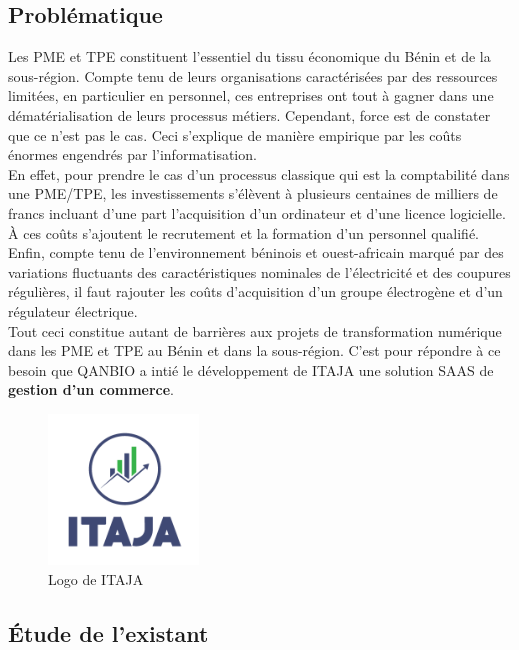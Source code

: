 \documentclass[12pt]{report}
\begin{document}
      \subsection{Problématique}
	Les \gls{PME} et \gls{TPE} constituent l’essentiel du tissu économique du Bénin et de la sous-région. Compte tenu de leurs organisations caractérisées par des ressources limitées, en particulier en personnel, ces entreprises ont tout à gagner dans une dématérialisation de leurs processus métiers. Cependant, force est de constater que ce n’est pas le cas. Ceci s’explique de manière empirique par les coûts énormes engendrés par l’informatisation.
	\\En effet, pour prendre le cas d’un processus classique qui est la comptabilité dans une PME/TPE, les investissements s’élèvent à plusieurs centaines de milliers de francs incluant d’une part l’acquisition d’un ordinateur et d’une licence logicielle. À ces coûts s’ajoutent le recrutement et la formation d’un personnel qualifié. Enfin, compte tenu de l’environnement béninois et ouest-africain marqué par des variations fluctuants des caractéristiques nominales de l'électricité et des coupures régulières, il faut rajouter les coûts d’acquisition d’un groupe électrogène et d’un régulateur électrique.
	\\Tout ceci constitue autant de barrières aux projets de transformation numérique dans les PME et TPE au Bénin et dans la sous-région. C’est pour répondre à ce besoin que QANBIO a intié le développement de ITAJA une solution \gls{SAAS} de \textbf{gestion d’un commerce}.
	
	\begin{figure}[H]
	  \begin{center}
	    \includegraphics[scale=0.5, width=4cm]{images/logoItaja.png}
	    \caption{Logo de ITAJA}
	  \end{center}
	\end{figure}
    
      \subsection{Étude de l'existant}
\end{document}
